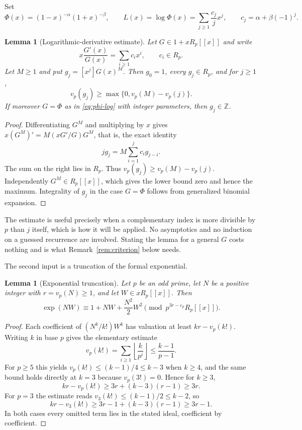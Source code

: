 \documentclass[11pt,a4paper]{article}
\numberwithin{equation}{section}
\newtheorem{lemma}[theorem]{Lemma}
\theoremstyle{definition}
\theoremstyle{remark}
\newcommand{\Z}{\mathbb Z}
\newcommand{\eps}{\varepsilon}
\begin{document}
Set
\begin{equation}\label{eq:phi-log}
 \Phi(x)=(1-x)^{-\alpha}(1+x)^{-\beta},\qquad
 L(x)=\log\Phi(x)=\sum_{j\ge1}\frac{c_j}{j}x^j,
 \qquad c_j=\alpha+\beta(-1)^j.
\end{equation}

\begin{lemma}[Logarithmic-derivative estimate]\label{lem:gcoef}
Let $G\in1+xR_p[[x]]$ and write
\[
 x\frac{G'(x)}{G(x)}=\sum_{i\ge1}c_ix^i,\qquad c_i\in R_p.
\]
Let $M\ge1$ and put $g_j=[x^j]G(x)^M$. Then $g_0=1$, every $g_j\in R_p$,
and for $j\ge1$,
\begin{equation}\label{eq:gvaluation}
 v_p(g_j)\ge\max\{0,v_p(M)-v_p(j)\}.
\end{equation}
If moreover $G=\Phi$ as in \eqref{eq:phi-log} with integer parameters, then
$g_j\in\Z$.
\end{lemma}
\begin{proof}
Differentiating $G^M$ and multiplying by $x$ gives
$x(G^M)'=M(xG'/G)G^M$, that is, the exact identity
\begin{equation}\label{eq:derivative-coeff}
 jg_j=M\sum_{i=1}^j c_i g_{j-i}.
\end{equation}
The sum on the right lies in $R_p$. Thus $v_p(g_j)\ge v_p(M)-v_p(j)$.
Independently $G^M\in R_p[[x]]$, which gives the lower bound zero and hence
the maximum. Integrality of $g_j$ in the case $G=\Phi$ follows from
generalized binomial expansion.
\end{proof}

The estimate is useful precisely when a complementary index is more divisible
by $p$ than $j$ itself, which is how it will be applied. No asymptotics and
no induction on a guessed recurrence are involved. Stating the lemma for a
general $G$ costs nothing and is what Remark~\ref{rem:criterion} below needs.

The second input is a truncation of the formal exponential.

\begin{lemma}[Exponential truncation]\label{lem:tail}
Let $p$ be an odd prime, let $N$ be a positive integer with
$r=v_p(N)\ge1$, and let $W\in xR_p[[x]]$. Then
\begin{equation}\label{eq:tail}
 \exp(NW)\equiv1+NW+\frac{N^2}{2}W^2
 \pmod{p^{3r-\eps_p}R_p[[x]]}.
\end{equation}
\end{lemma}
\begin{proof}
Each coefficient of $(N^k/k!)W^k$ has valuation at least $kr-v_p(k!)$.
Writing $k$ in base $p$ gives the elementary estimate
\[
 v_p(k!)=\sum_{i\ge1}\left\lfloor\frac{k}{p^i}\right\rfloor
 \le\frac{k-1}{p-1}.
\]
For $p\ge5$ this yields $v_p(k!)\le(k-1)/4\le k-3$ when $k\ge4$, and the
same bound holds directly at $k=3$ because $v_p(3!)=0$. Hence for $k\ge3$,
\[
 kr-v_p(k!)\ge3r+(k-3)(r-1)\ge3r.
\]
For $p=3$ the estimate reads $v_3(k!)\le(k-1)/2\le k-2$, so
\[
 kr-v_3(k!)\ge3r-1+(k-3)(r-1)\ge3r-1.
\]
In both cases every omitted term lies in the stated ideal, coefficient by
coefficient.
\end{proof}
\end{document}
